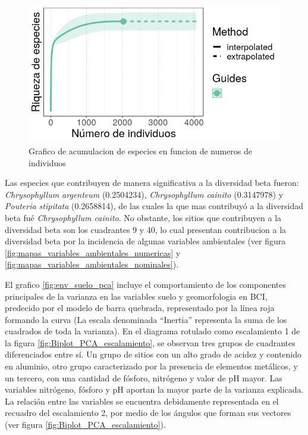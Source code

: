 \documentclass[11pt,]{article}
\begin{document}
\begin{figure}
\centering
\includegraphics{acumulacion_especies_individuos.png}
\caption{Grafico de acumulacion de especies en funcion de numeros de
individuos \label{fig:acumulacion_especies_individuos}}
\end{figure}

Las especies que contribuyen de manera significativa a la diversidad
beta fueron: \emph{Chrysophyllum argenteum} (0.2504234),
\emph{Chrysophyllum cainito} (0.3147978) y \emph{Pouteria stipitata}
(0.2658814), de las cuales la que mas contribuyó a la diversidad beta
fué \emph{Chrysophyllum cainito}. No obstante, los sitios que
contribuyen a la diversidad beta son los cuadrantes 9 y 40, lo cual
presentan contribucion a la diversidad beta por la incidencia de algunas
variables ambientales (ver figura
\ref{fig:mapas_variables_ambientales_numericas} y
\ref{fig:mapas_variables_ambientales_nominales}).

El grafico \ref{fig:env_suelo_pca} incluye el comportamiento de los
componentes principales de la varianza en las variables suelo y
geomorfologia en BCI, predecido por el modelo de barra quebrada,
representado por la línea roja formando la curva (La escala denominada
``Inertia'' representa la suma de los cuadrados de toda la varianza). En
el diagrama rotulado como escalamiento 1 de la figura
\ref{fig:Biplot_PCA_escalamiento}, se observan tres grupos de cuadrantes
diferenciados entre sí. Un grupo de sitios con un alto grado de acidez y
contenido en aluminio, otro grupo caracterizado por la presencia de
elementos metálicos, y un tercero, con una cantidad de fósforo,
nitrógeno y valor de pH mayor. Las variables nitrógeno, fósforo y pH
aportan la mayor parte de la varianza explicada. La relación entre las
variables se encuentra debidamente representada en el recuadro del
escalamiento 2, por medio de los ángulos que forman sus vectores (ver
figura \ref{fig:Biplot_PCA_escalamiento}).
\end{document}
